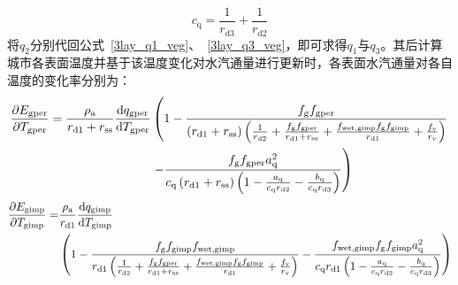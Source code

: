 %
\begin{equation}
  c_{\mathrm{q}} = \frac{1}{r_{\mathrm{d3}}} + \frac{1}{r_{\mathrm{d2}}}
\end{equation}
将$q_{2}$分别代回公式~\eqref{3lay_q1_veg}、~\eqref{3lay_q3_veg}，即可求得$q_{1}$与$q_{3}$。其后计算城市各表面温度并基于该温度变化对水汽通量进行更新时，各表面水汽通量对各自温度的变化率分别为：
\begin{equation}
  \begin{split}
    \frac{\partial  E_{\mathrm{gper}}}{\partial T_{\mathrm{gper}}} =\frac{\rho _{\rm a}}{r_{\mathrm{d1}}+r_{\mathrm{ss}}} \frac{{\mathrm {d}} q_{\mathrm{gper}}}{{\mathrm {d}} T_{\mathrm{gper}}} &\left(1-\frac{f_{\mathrm{g}}f_{\mathrm{gper}}}{\left(r_{\mathrm{d1}}+r_{\mathrm{ss}}\right) \left(\frac{1}{r_{\mathrm{d2}}} + \frac{f_{\mathrm{g}} f_{\mathrm{gper}}}{r_{\mathrm{d1}} + r_{\mathrm{ss}}} + \frac{f_{\mathrm{wet,gimp}} f_{\mathrm{g}} f_{\mathrm{gimp}}}{r_{\mathrm{d1}}}+\frac{f_{\rm v}}{r_{\mathrm{v}}}\right)}  \right. \\
    & \left. - \frac{f_{\mathrm{g}} f_{\mathrm{gper}} a_{\mathrm{q}}^2}{c_{\mathrm{q}}\left(r_{\mathrm{d1}}+r_{\mathrm{ss}}\right) \left( 1 - \frac{a_{\mathrm{q}}}{c_{\mathrm{q}} r_{\mathrm{d2}}} - \frac{b_{\mathrm{q}}}{c_{\mathrm{q}} r_{\mathrm{d3}}} \right)}\right)
  \end{split}
\end{equation}
%
\begin{equation}
  \begin{split}
    \frac{\partial  E_{\mathrm{gimp}}}{\partial T_{\mathrm{gimp}}} = &\frac{\rho _{\rm a}}{r_{\mathrm{d1}}} \frac{{\mathrm {d}} q_{\mathrm{gimp}}}{{\mathrm {d}} T_{\mathrm{gimp}}} \\
    &\left(1-\frac{f_{\mathrm{g}}f_{\mathrm{gimp}}f_{\mathrm{wet,gimp}}}{r_{\mathrm{d1}} \left(\frac{1}{r_{\mathrm{d2}}} + \frac{f_{\mathrm{g}} f_{\mathrm{gper}}}{r_{\mathrm{d1}} + r_{\mathrm{ss}}} + \frac{f_{\mathrm{wet,gimp}} f_{\mathrm{g}} f_{\mathrm{gimp}}}{r_{\mathrm{d1}}}+\frac{f_{\rm v}}{r_{\mathrm{v}}}\right)} - \frac{f_{\mathrm{wet,gimp}} f_{\mathrm{g}} f_{\mathrm{gimp}} a_{\mathrm{q}}^2}{c_{\mathrm{q}} r_{\mathrm{d1}}\left( 1 - \frac{a_{\mathrm{q}}}{c_{\mathrm{q}} r_{\mathrm{d2}}} - \frac{b_{\mathrm{q}}}{c_{\mathrm{q}} r_{\mathrm{d3}}} \right)}\right)
  \end{split}
\end{equation}
%
